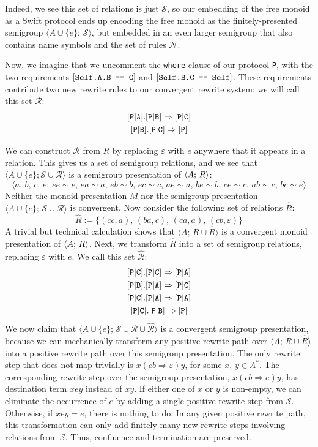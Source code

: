 \documentclass[../generics]{subfiles}
\begin{document}
\begin{example}
Indeed, we see this set of relations is just $\mathcal{S}$, so our embedding of the free monoid as a Swift protocol ends up encoding the free monoid as the finitely-presented semigroup $\langle A\cup\{e\};\,\mathcal{S}\rangle$, but embedded in an even larger semigroup that also contains name symbols and the set of rules $\mathcal{N}$.

Now, we imagine that we uncomment the \texttt{where} clause of our protocol \texttt{P}, with the two requirements $[\texttt{Self.A.B == C}]$ and $[\texttt{Self.B.C == Self}]$. These requirements contribute two new rewrite rules to our convergent rewrite system; we will call this set $\mathcal{R}$:
\begin{gather*}
\assocsym{P}{A}.\assocsym{P}{B}\Rightarrow\assocsym{P}{C}\\
\assocsym{P}{B}.\assocsym{P}{C}\Rightarrow\protosym{P}
\end{gather*}

We can construct $\mathcal{R}$ from $R$ by replacing $\varepsilon$ with $e$ anywhere that it appears in a relation. This gives us a set of semigroup relations, and we see that $\langle A\cup\{e\}; \mathcal{S}\cup\mathcal{R} \rangle$ is a semigroup presentation of $\langle A;\,R\rangle$:
\[\langle a,\,b,\,c,\,e;\,ee\sim e,\,ea\sim a,\,eb\sim b,\,ec\sim c,\,ae\sim a,\,be\sim b,\,ce\sim c,\,ab\sim c,\,bc\sim e\rangle\]
Neither the monoid presentation $M$ nor the semigroup presentation $\langle A\cup\{e\};\,\mathcal{S}\cup\mathcal{R}\rangle$ is convergent. Now consider the following set of relations $\hat{R}$:
\[\hat{R} := \{(cc,a),\,(ba,c),\,(ca,a),\,(cb,\varepsilon)\}\]
A trivial but technical calculation shows that $\langle A;\,R\cup\hat{R}\rangle$ is a convergent monoid presentation of $\langle A;\,R\rangle$. Next, we transform $\hat{R}$ into a set of semigroup relations, replacing $\varepsilon$ with $e$. We call this set $\hat{\mathcal{R}}$:
\begin{gather*}
\assocsym{P}{C}.\assocsym{P}{C}\Rightarrow\assocsym{P}{A}\\
\assocsym{P}{B}.\assocsym{P}{A}\Rightarrow\assocsym{P}{C}\\
\assocsym{P}{C}.\assocsym{P}{A}\Rightarrow\assocsym{P}{A}\\
\assocsym{P}{C}.\assocsym{P}{B}\Rightarrow\protosym{P}
\end{gather*}
We now claim that $\langle A\cup\{e\};\,\mathcal{S}\cup\mathcal{R}\cup\hat{\mathcal{R}}\rangle$ is a convergent semigroup presentation, because we can mechanically transform any positive rewrite path over $\langle A;\,R\cup\hat{R}\rangle$ into a positive rewrite path over this semigroup presentation. The only rewrite step that does not map trivially is $x(cb\Rightarrow\varepsilon)y$, for some $x$, $y\in A^*$. The corresponding rewrite step over the semigroup presentation, $x(cb\Rightarrow e)y$, has destination term $xey$ instead of $xy$. If either one of $x$ or $y$ is non-empty, we can eliminate the occurrence of $e$ by adding a single positive rewrite step from $\mathcal{S}$. Otherwise, if $xey=e$, there is nothing to do. In any given positive rewrite path, this transformation can only add finitely many new rewrite steps involving relations from $\mathcal{S}$. Thus, confluence and termination are preserved.


\end{example}
\end{document}
